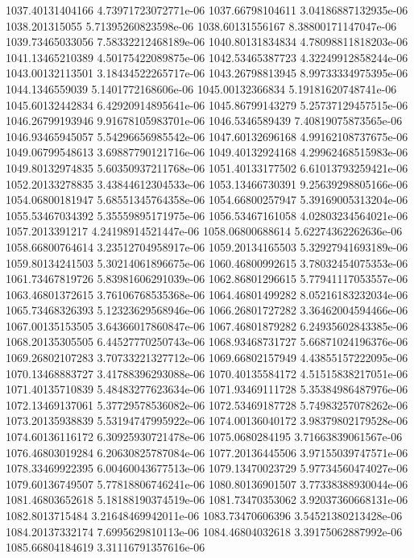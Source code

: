 {1037.40131404166 4.73971723072771e-06
1037.66798104611 3.04186887132935e-06
1038.201315055 5.71395260823598e-06
1038.60131556167 8.38800171147047e-06
1039.73465033056 7.58332212468189e-06
1040.80131834834 4.78098811818203e-06
1041.13465210389 4.50175422089875e-06
1042.53465387723 4.32249912858244e-06
1043.00132113501 3.18434522265717e-06
1043.26798813945 8.99733334975395e-06
1044.1346559039 5.1401772168606e-06
1045.00132366834 5.19181620748741e-06
1045.60132442834 6.42920914895641e-06
1045.86799143279 5.25737129457515e-06
1046.26799193946 9.91678105983701e-06
1046.5346589439 7.40819075873565e-06
1046.93465945057 5.54296656985542e-06
1047.60132696168 4.99162108737675e-06
1049.06799548613 3.69887790121716e-06
1049.40132924168 4.29962468515983e-06
1049.80132974835 5.60350937211768e-06
1051.40133177502 6.61013793259421e-06
1052.20133278835 3.43844612304533e-06
1053.13466730391 9.25639298805166e-06
1054.06800181947 5.68551345764358e-06
1054.66800257947 5.39169005313204e-06
1055.53467034392 5.35559895171975e-06
1056.53467161058 4.02803234564021e-06
1057.2013391217 4.24198914521447e-06
1058.06800688614 5.62274362262636e-06
1058.66800764614 3.23512704958917e-06
1059.20134165503 5.32927941693189e-06
1059.80134241503 5.30214061896675e-06
1060.46800992615 3.78032454075353e-06
1061.73467819726 5.83981606291039e-06
1062.86801296615 5.77941117053557e-06
1063.46801372615 3.76106768535368e-06
1064.46801499282 8.05216183232034e-06
1065.73468326393 5.12323629568946e-06
1066.26801727282 3.36462004594466e-06
1067.00135153505 3.64366017860847e-06
1067.46801879282 6.24935602843385e-06
1068.20135305505 6.44527770250743e-06
1068.93468731727 5.66871024196376e-06
1069.26802107283 3.70733221327712e-06
1069.66802157949 4.43855157222095e-06
1070.13468883727 3.41788396293088e-06
1070.40135584172 4.51515838217051e-06
1071.40135710839 5.48483277623634e-06
1071.93469111728 5.35384986487976e-06
1072.13469137061 5.37729578536082e-06
1072.53469187728 5.74983257078262e-06
1073.20135938839 5.53194747995922e-06
1074.00136040172 3.98379802179528e-06
1074.60136116172 6.30925930721478e-06
1075.0680284195 3.71663839061567e-06
1076.46803019284 6.20630825787084e-06
1077.20136445506 3.97155039747571e-06
1078.33469922395 6.00460043677513e-06
1079.13470023729 5.97734560474027e-06
1079.60136749507 5.77818806746241e-06
1080.80136901507 3.77338388930044e-06
1081.46803652618 5.18188190374519e-06
1081.73470353062 3.92037360668131e-06
1082.8013715484 3.21648469942011e-06
1083.73470606396 3.54521380213428e-06
1084.20137332174 7.6995629810113e-06
1084.46804032618 3.39175062887992e-06
1085.66804184619 3.31116791357616e-06
}

